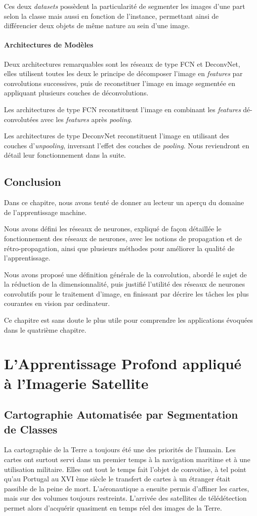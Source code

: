 \documentclass[a4paper, 11pt]{report}
\begin{document}
Ces deux \emph{datasets} possèdent la particularité de segmenter les images d'une part selon la classe mais aussi en fonction de l'instance, permettant ainsi de différencier deux objets de même nature au sein d'une image.
\subsubsection{Architectures de Modèles}
Deux architectures remarquables sont les réseaux de type FCN et DeconvNet, elles utilisent toutes les deux le principe de décomposer l'image en \emph{features} par convolutions successives, puis de reconstituer l'image en image segmentée en appliquant plusieurs couches de déconvolutions.

Les architectures de type FCN reconstituent l'image en combinant les \emph{features} dé-convolutées avec les \emph{features} après \emph{pooling}.

Les architectures de type DeconvNet reconstituent l'image en utilisant des couches d'\emph{unpooling}, inversant l'effet des couches de \emph{pooling}. Nous reviendront en détail leur fonctionnement dans la suite.

\section{Conclusion}
Dans ce chapitre, nous avons tenté de donner au lecteur un aperçu du domaine de l'apprentissage machine.

Nous avons défini les réseaux de neurones, expliqué de façon détaillée le fonctionnement des réseaux de neurones, avec les notions de propagation et de rétro-propagation, ainsi que plusieurs méthodes pour améliorer la qualité de l'apprentissage.

Nous avons proposé une définition générale de la convolution, abordé le sujet de la réduction de la dimensionnalité, puis justifié l'utilité des réseaux de neurones convolutifs pour le traitement d'image, en finissant par décrire les tâches les plus courantes en vision par ordinateur.

Ce chapitre est sans doute le plus utile pour comprendre les applications évoquées dans le quatrième chapitre.
\chapter{L'Apprentissage Profond appliqué à l'Imagerie Satellite}
\section{Cartographie Automatisée par Segmentation de Classes}
La cartographie de la Terre a toujours été une des priorités de l'humain.
Les cartes ont surtout servi dans un premier temps à la navigation maritime et à une utilisation militaire. Elles ont tout le temps fait l'objet de convoitise, à tel point qu'au Portugal au XVI ème siècle le transfert de cartes à un étranger était passible de la peine de mort. L'aéronautique a ensuite permis d'affiner les cartes, mais sur des volumes toujours restreints. L'arrivée des satellites de télédétection permet alors d'acquérir quasiment en temps réel des images de la Terre.
\end{document}
